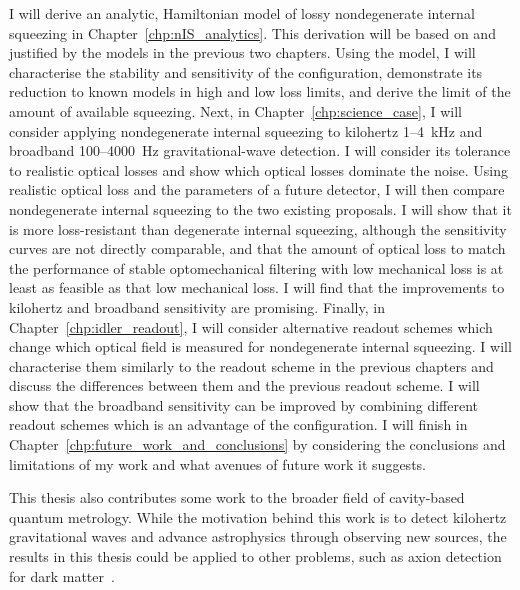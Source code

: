 I will derive an analytic, Hamiltonian model of lossy nondegenerate internal squeezing in Chapter~\ref{chp:nIS_analytics}. This derivation will be based on and justified by the models in the previous two chapters. Using the model, I will characterise the stability and sensitivity of the configuration, demonstrate its reduction to known models in high and low loss limits, and derive the limit of the amount of available squeezing.
Next, in Chapter~\ref{chp:science_case}, I will consider applying nondegenerate internal squeezing to kilohertz 1--4~kHz and broadband 100--4000~Hz gravitational-wave detection. I will consider its tolerance to realistic optical losses and show which optical losses dominate the noise. Using realistic optical loss and the parameters of a future detector, I will then compare nondegenerate internal squeezing to the two existing proposals. I will show that it is more loss-resistant than degenerate internal squeezing, although the sensitivity curves are not directly comparable, and that the amount of optical loss to match the performance of stable optomechanical filtering with low mechanical loss is at least as feasible as that low mechanical loss. I will find that the improvements to kilohertz and broadband sensitivity are promising.
Finally, in Chapter~\ref{chp:idler_readout}, I will consider alternative readout schemes which change which optical field is measured for nondegenerate internal squeezing. I will characterise them similarly to the readout scheme in the previous chapters and discuss the differences between them and the previous readout scheme. I will show that the broadband sensitivity can be improved by combining different readout schemes which is an advantage of the configuration.
I will finish in Chapter~\ref{chp:future_work_and_conclusions} by considering the conclusions and limitations of my work and what avenues of future work it suggests.

This thesis also contributes some work to the broader field of cavity-based quantum metrology. While the motivation behind this work is to detect kilohertz gravitational waves and advance astrophysics through observing new sources, the results in this thesis could be applied to other problems, such as axion detection for dark matter~\cite{}.



